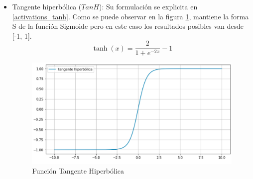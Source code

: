 \begin{itemize}
 	\item Tangente hiperbólica (\(TanH\)): Su formulación se explicita en \ref{activations_tanh}. Como se puede observar en la figura \ref{fig:activationstanh}, mantiene la forma S de la función Sigmoide pero en este caso los resultados posibles van desde [-1, 1]. 
 	\begin{equation}
\label{activations_tanh}
 	\tanh (x)=\frac{2}{1+e^{-2 x}}-1
 	\end{equation}
 	\begin{figure}[!h]
 		\centering
 		\includegraphics[width=0.7\linewidth]{images/activations_tanh}
 		\caption[Función Tangente Hiperbólica]{Función Tangente Hiperbólica}
 		\label{fig:activationstanh}
 	\end{figure}
 	 	 	

\end{itemize}
